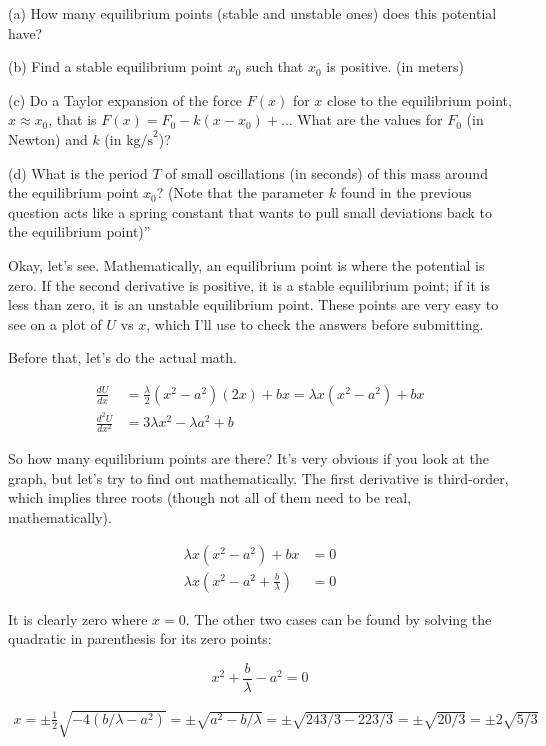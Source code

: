 \documentclass[8.01x]{subfiles}
\begin{document}
(a) How many equilibrium points (stable and unstable ones) does this potential have?

(b) Find a stable equilibrium point $x_0$ such that $x_0$ is positive. (in meters)

(c) Do a Taylor expansion of the force $F(x)$ for $x$ close to the equilibrium point, $x \approx x_0$, that is $F(x) = F_0 - k(x - x_0) + \dots$ What are the values for $F_0$ (in Newton) and $k$ (in $\text{kg/s}^2$)?

(d) What is the period $T$ of small oscillations (in seconds) of this mass around the equilibrium point $x_0$? (Note that the parameter $k$ found in the previous question acts like a spring constant that wants to pull small deviations back to the equilibrium point)''

Okay, let's see. Mathematically, an equilibrium point is where the potential is zero. If the second derivative is positive, it is a stable equilibrium point; if it is less than zero, it is an unstable equilibrium point. These points are very easy to see on a plot of $U$ vs $x$, which I'll use to check the answers before submitting.

Before that, let's do the actual math.

\begin{align}
\frac{dU}{dx}     &= \frac{\lambda}{2}(x^2 - a^2) (2x) + b x = \lambda x (x^2 - a^2) + b x\\
\frac{d^2U}{dx^2} &= 3 \lambda x^2 - \lambda a^2 + b
\end{align}

So how many equilibrium points are there? It's very obvious if you look at the graph, but let's try to find out mathematically. The first derivative is third-order, which implies three roots (though not all of them need to be real, mathematically).

\begin{align}
\lambda x (x^2 - a^2) + b x &= 0\\
\lambda x (x^2 - a^2 + \frac{b}{\lambda})   &= 0
\end{align}

It is clearly zero where $x = 0$. The other two cases can be found by solving the quadratic in parenthesis for its zero points:

\begin{equation}
x^2 + \frac{b}{\lambda} - a^2 = 0
\end{equation}

\begin{align}
x = \pm \frac{1}{2} \sqrt{-4(b/\lambda - a^2)} = \pm \sqrt{a^2 - b/\lambda} = \pm \sqrt{243/3 - 223/3} = \pm \sqrt{20/3} = \pm 2 \sqrt{5/3}
\end{align}
\end{document}
